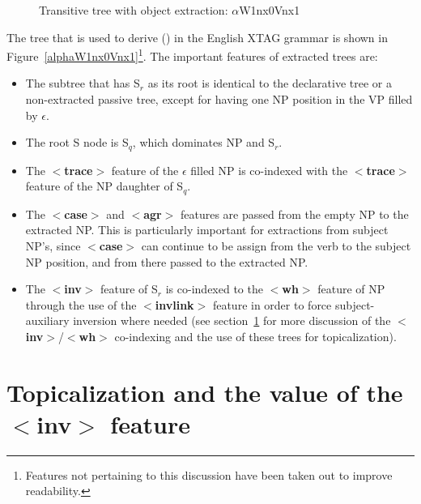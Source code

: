 \begin{figure}[htb]
\centering
\mbox{}
\caption{Transitive tree with object extraction: $\alpha$W1nx0Vnx1}
\label{alphaW1nx0Vnx1}
\label{2;5,1}
\end{figure} 


The tree that is used to derive () in the English XTAG grammar is shown
in Figure~\ref{alphaW1nx0Vnx1}\footnote{Features not pertaining to this
discussion have been taken out to improve readability.}.  The important
features of extracted trees are:

\begin{itemize}
\item The subtree that has S$_{r}$ as its root is identical to the
declarative tree or a non-extracted passive tree, except for having
one NP position in the VP filled by $\epsilon$.

\item The root S node is S$_{q}$, which dominates NP and S$_{r}$.

\item The {\bf $<$trace$>$} feature of the $\epsilon$ filled NP is co-indexed 
with the {\bf $<$trace$>$} feature of the NP daughter of S$_{q}$.

\item The {\bf $<$case$>$} and {\bf $<$agr$>$} features are passed from the 
empty NP to the extracted NP.  This is particularly important for extractions
from subject NP's, since {\bf $<$case$>$} can continue to be assign from the
verb to the subject NP position, and from there passed to the extracted NP.

\item The {\bf $<$inv$>$} feature of S$_{r}$ is co-indexed to the 
{\bf $<$wh$>$} feature of NP through the use of the {\bf $<$invlink$>$} feature
in order to force subject-auxiliary inversion where needed (see
section~\ref{topicalization} for more discussion of the {\bf
$<$inv$>$}/{\bf$<$wh$>$} co-indexing and the use of these trees for
topicalization).

\end{itemize}



\section{Topicalization and the value of the {\bf $<$inv$>$} feature}
\label{topicalization}

